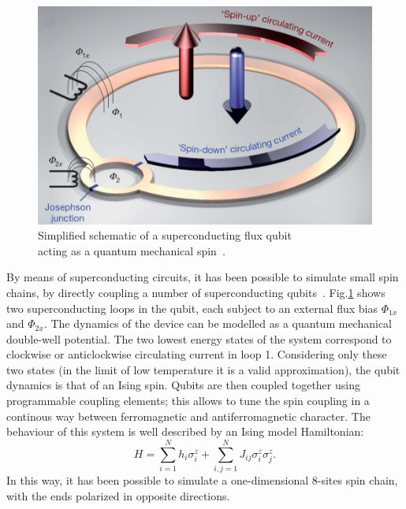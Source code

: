 \begin{figure}[H]
    \centering
    \includegraphics[scale=0.5]{Figures/superconductinCircuit_SpinSystem.png}
    \captionsetup{width=1.\linewidth}
    \caption{Simplified schematic of a superconducting flux qubit \\acting as a quantum mechanical spin~\cite{8spinChain_simulatedByQubits}.}
    \label{fig:superconductinCircuit_SpinSystem}
\end{figure}

By means of superconducting circuits, it has been possible to simulate small spin chains, by directly coupling a number of superconducting qu\-bits~\cite{8spinChain_simulatedByQubits}. Fig.\ref{fig:superconductinCircuit_SpinSystem} shows two superconducting loops in the qubit, each subject to an external flux bias $\Phi_{1x}$ and $\Phi_{2x}$. The dynamics of the device can be modelled as a quantum mechanical double-well potential. The two lowest energy states of the system correspond to clockwise or anticlockwise circulating current in loop 1. Considering only these two states (in the limit of low temperature it is a valid approximation), the qubit dynamics is that of an Ising spin. Qubits are then coupled together using programmable coupling elements; this allows to tune the spin coupling in a continous way between ferromagnetic and antiferromagnetic character. The behaviour of this system is well described by an Ising model Hamiltonian:
\begin{equation}
    H = \sum_{i=1}^{N} h_i\sigma_i^z + \sum_{i,j=1}^{N} J_{ij}\sigma_i^z\sigma_j^z.
\end{equation}
In this way, it has been possible to simulate a one-dimensional 8-sites spin chain, with the ends polarized in opposite directions.